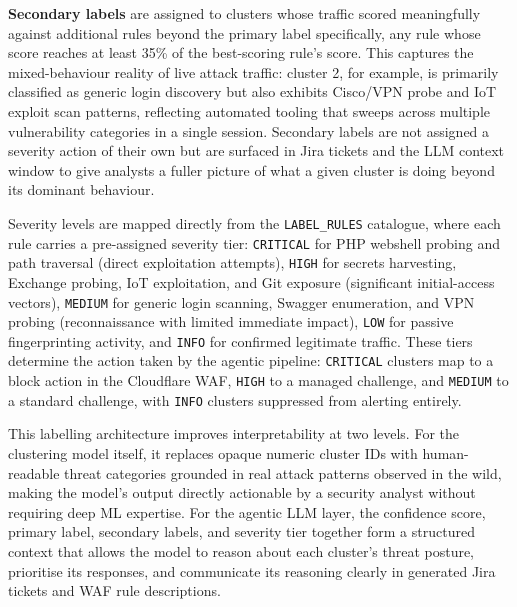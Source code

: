 \documentclass[12pt, a4paper]{report}   %
\begin{document}
\textbf{Secondary labels} are assigned to clusters whose traffic scored 
meaningfully against additional rules beyond the primary label specifically, 
any rule whose score reaches at least 35\% of the best-scoring rule's score. 
This captures the mixed-behaviour reality of live attack traffic: cluster 2, 
for example, is primarily classified as generic login discovery but also exhibits 
Cisco/VPN probe and IoT exploit scan patterns, reflecting automated tooling that 
sweeps across multiple vulnerability categories in a single session. Secondary 
labels are not assigned a severity action of their own but are surfaced in Jira 
tickets and the LLM context window to give analysts a fuller picture of what a 
given cluster is doing beyond its dominant behaviour.

Severity levels are mapped directly from the \texttt{LABEL\_RULES} catalogue, 
where each rule carries a pre-assigned severity tier: \texttt{CRITICAL} for 
PHP webshell probing and path traversal (direct exploitation attempts), 
\texttt{HIGH} for secrets harvesting, Exchange probing, IoT exploitation, and 
Git exposure (significant initial-access vectors), \texttt{MEDIUM} for generic 
login scanning, Swagger enumeration, and VPN probing (reconnaissance with 
limited immediate impact), \texttt{LOW} for passive fingerprinting activity, 
and \texttt{INFO} for confirmed legitimate traffic. These tiers determine the 
action taken by the agentic pipeline: \texttt{CRITICAL} clusters map to a 
block action in the Cloudflare WAF, \texttt{HIGH} to a managed challenge, 
and \texttt{MEDIUM} to a standard challenge, with \texttt{INFO} clusters 
suppressed from alerting entirely.

This labelling architecture improves interpretability at two levels. For 
the clustering model itself, it replaces opaque numeric cluster IDs with 
human-readable threat categories grounded in real attack patterns observed 
in the wild, making the model's output directly actionable by a security 
analyst without requiring deep ML expertise. For the agentic LLM layer, 
the confidence score, primary label, secondary labels, and severity tier 
together form a structured context that allows the model to reason about 
each cluster's threat posture, prioritise its responses, and communicate 
its reasoning clearly in generated Jira tickets and WAF rule descriptions.
\end{document}
